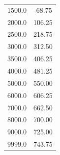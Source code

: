 \begin{table}
\begin{tabular}{|c c}
  1500.0	&	-68.75   \\
  2000.0	&	106.25   \\
  2500.0	&	218.75   \\
  3000.0	&	312.50   \\
  3500.0	&	406.25   \\
  4000.0	&	481.25   \\
  5000.0	&	550.00   \\
  6000.0	&	606.25   \\
  7000.0	&	662.50   \\
  8000.0	&	700.00   \\
  9000.0	&	725.00   \\
  9999.0	&	743.75   \\
  \bottomrule
  \end{tabular}
\end{table}


